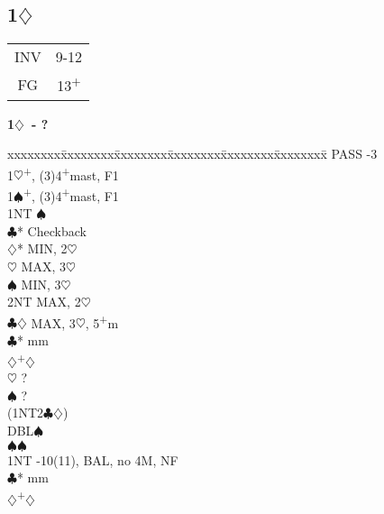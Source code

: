 \documentclass[10pt]{article}
\renewcommand{\c}{$\clubsuit$}
\renewcommand{\d}{$\diamondsuit$}
\newcommand{\h}{$\heartsuit$}
\newcommand{\s}{$\spadesuit$}
\newcommand{\p}{\textsuperscript{+}}
\newcommand{\m}{\textsuperscript{\textminus}}
\newcommand{\x}{DBL}
\newenvironment{bidtable}[1][]
{\textbf{#1}
  \begin{adjustwidth}{1em}{}
    \addvspace{2pt}
    \begin{tabbing}
      xxxxxxxx\=xxxxxxxx\=xxxxxxxx\=xxxxxxxx\=xxxxxxxx\=xxxxxxxx\=\kill}
{\end{tabbing}\end{adjustwidth}\bigskip}%
\newcommand{\pdfd}{\texorpdfstring{\d{}}{D}}
\begin{document}
\begin{multicols*}{2}
\subsection{1\pdfd}

\begin{tabular}{c|c}
INV & 9-12 \\
FG  & 13\p \\
\end{tabular}

\begin{bidtable}[1\d\ - ?]
PASS      -3                                              \\
1\h       {}\p , (3)4\p mast, F1                            \\
1\s       {}\p , (3)4\p mast, F1                            \\
          \> 1NT        \m\s                              \\
          \>            \c* \> Checkback                  \\
          \>            \>      \d*  \> MIN, 2\m\h        \\
          \>            \>      \h   \> MAX, 3\h          \\
          \>            \>      \s   \> MIN, 3\h          \\
          \>            \>      \> 2NT   \> MAX, 2\m\h        \\
          \>            \>      \c\d \> MAX, 3\h, 5\p m   \\
          \c*       {} mm                              \\
          \d        {}\p\d                              \\
          \h        \> ?                                  \\
          \s        \> ?                                  \\
          \> (1NT2\c\d) \>                                    \\
          \>            \> \x   {}\s                        \\
          \>            \s  {}\s                        \\
1NT       -10(11), BAL, no 4M, NF                         \\
          \c*       {} mm                              \\
          \d        {}\p\d                              \\

\end{bidtable}
\end{multicols*}
\end{document}
